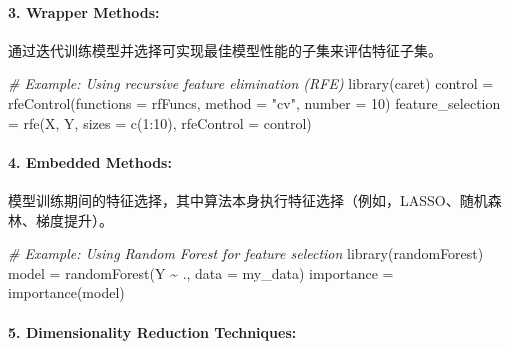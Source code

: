 \documentclass[
]{article}
\newenvironment{Shaded}{}{}
\newcommand{\AttributeTok}[1]{\textcolor[rgb]{0.49,0.56,0.16}{#1}}
\newcommand{\CommentTok}[1]{\textcolor[rgb]{0.38,0.63,0.69}{\textit{#1}}}
\newcommand{\DecValTok}[1]{\textcolor[rgb]{0.25,0.63,0.44}{#1}}
\newcommand{\FunctionTok}[1]{\textcolor[rgb]{0.02,0.16,0.49}{#1}}
\newcommand{\NormalTok}[1]{#1}
\newcommand{\OtherTok}[1]{\textcolor[rgb]{0.00,0.44,0.13}{#1}}
\newcommand{\SpecialCharTok}[1]{\textcolor[rgb]{0.25,0.44,0.63}{#1}}
\newcommand{\StringTok}[1]{\textcolor[rgb]{0.25,0.44,0.63}{#1}}
\begin{document}
\hypertarget{3-wrapper-methods}{%
\paragraph{\texorpdfstring{3. \textbf{Wrapper
Methods:}}{3. Wrapper Methods:}}\label{3-wrapper-methods}}

通过迭代训练模型并选择可实现最佳模型性能的子集来评估特征子集。

\begin{Shaded}
\begin{Highlighting}[]
\CommentTok{\# Example: Using recursive feature elimination (RFE)}
\FunctionTok{library}\NormalTok{(caret)}
\NormalTok{control }\OtherTok{=} \FunctionTok{rfeControl}\NormalTok{(}\AttributeTok{functions =}\NormalTok{ rfFuncs, }\AttributeTok{method =} \StringTok{"cv"}\NormalTok{, }\AttributeTok{number =} \DecValTok{10}\NormalTok{)}
\NormalTok{feature\_selection }\OtherTok{=} \FunctionTok{rfe}\NormalTok{(X, Y, }\AttributeTok{sizes =} \FunctionTok{c}\NormalTok{(}\DecValTok{1}\SpecialCharTok{:}\DecValTok{10}\NormalTok{), }\AttributeTok{rfeControl =}\NormalTok{ control)}
\end{Highlighting}
\end{Shaded}

\hypertarget{4-embedded-methods}{%
\paragraph{\texorpdfstring{4. \textbf{Embedded
Methods:}}{4. Embedded Methods:}}\label{4-embedded-methods}}

模型训练期间的特征选择，其中算法本身执行特征选择（例如，LASSO、随机森林、梯度提升）。

\begin{Shaded}
\begin{Highlighting}[]
\CommentTok{\# Example: Using Random Forest for feature selection}
\FunctionTok{library}\NormalTok{(randomForest)}
\NormalTok{model }\OtherTok{=} \FunctionTok{randomForest}\NormalTok{(Y }\SpecialCharTok{\textasciitilde{}}\NormalTok{ ., }\AttributeTok{data =}\NormalTok{ my\_data)}
\NormalTok{importance }\OtherTok{=} \FunctionTok{importance}\NormalTok{(model)}
\end{Highlighting}
\end{Shaded}

\hypertarget{5-dimensionality-reduction-techniques}{%
\paragraph{\texorpdfstring{5. \textbf{Dimensionality Reduction
Techniques:}}{5. Dimensionality Reduction Techniques:}}\label{5-dimensionality-reduction-techniques}}
\end{document}
